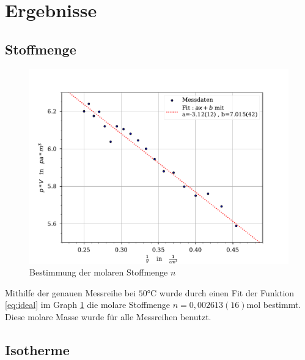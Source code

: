 \documentclass[11pt, a4paper]{article}
\begin{document}
    \section{Ergebnisse}
    \subsection{Stoffmenge}
    \begin{figure}
        \centering
        \includegraphics[width=\textwidth]{./Plots/3Plot_n.pdf}

        \caption{Bestimmung der molaren Stoffmenge $n$}
        \label{fig:n}
    \end{figure}
    
    Mithilfe der genauen Messreihe bei $50 \si{\celsius}$ wurde durch einen Fit der
    Funktion \ref{eq:ideal} im Graph \ref{fig:n} die molare Stoffmenge $n = 0,002613(16) \si{\mole}$ bestimmt.
    Diese molare Masse wurde für alle Messreihen benutzt.

    \subsection{Isotherme}
    
\end{document}
